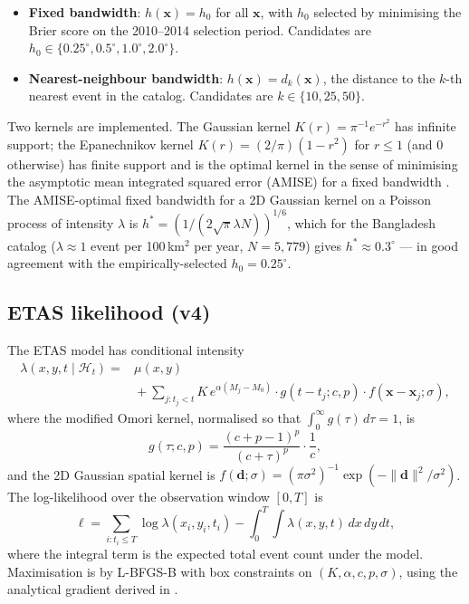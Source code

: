 \documentclass[10pt,a4paper,twocolumn]{article}
\begin{document}
\begin{itemize}[leftmargin=1.2em,itemsep=2pt,topsep=2pt]
\item \textbf{Fixed bandwidth}: $h(\mathbf{x}) = h_0$ for all $\mathbf{x}$, with $h_0$ selected by minimising the Brier score on the 2010--2014 selection period. Candidates are $h_0\in\{0.25^\circ, 0.5^\circ, 1.0^\circ, 2.0^\circ\}$.
\item \textbf{Nearest-neighbour bandwidth}: $h(\mathbf{x}) = d_k(\mathbf{x})$, the distance to the $k$-th nearest event in the catalog. Candidates are $k\in\{10, 25, 50\}$.
\end{itemize}

Two kernels are implemented. The Gaussian kernel $K(r) = \pi^{-1} e^{-r^2}$ has infinite support; the Epanechnikov kernel $K(r) = (2/\pi)(1-r^2)$ for $r\leq 1$ (and 0 otherwise) has finite support and is the optimal kernel in the sense of minimising the asymptotic mean integrated squared error (AMISE) for a fixed bandwidth \cite{silverman1986}. The AMISE-optimal fixed bandwidth for a 2D Gaussian kernel on a Poisson process of intensity $\lambda$ is $h^* = (1/(2\sqrt{\pi}\lambda N))^{1/6}$, which for the Bangladesh catalog ($\lambda\approx 1$ event per 100\,km$^2$ per year, $N=5{,}779$) gives $h^*\approx 0.3^\circ$ --- in good agreement with the empirically-selected $h_0=0.25^\circ$.

\subsection{ETAS likelihood (v4)}\label{app:etas-likelihood}

The ETAS model has conditional intensity
\begin{align*}
\lambda(x, y, t \mid \mathcal{H}_t) = {}& \mu(x, y) \\
&{} + \sum_{j: t_j < t} K\, e^{\alpha(M_j - M_0)} \cdot g(t - t_j; c, p) \cdot f(\mathbf{x} - \mathbf{x}_j; \sigma),
\end{align*}
where the modified Omori kernel, normalised so that $\int_0^\infty g(\tau)\, d\tau = 1$, is
\begin{equation}\label{eq:omori-kernel}
g(\tau; c, p) = \frac{(c+p-1)^p}{(c+\tau)^p} \cdot \frac{1}{c},
\end{equation}
and the 2D Gaussian spatial kernel is $f(\mathbf{d}; \sigma) = (\pi \sigma^2)^{-1} \exp(-\|\mathbf{d}\|^2 / \sigma^2)$. The log-likelihood over the observation window $[0, T]$ is
\begin{equation}\label{eq:etas-loglik}
\ell = \sum_{i: t_i \leq T} \log \lambda(x_i, y_i, t_i) - \int_0^T \!\!\int \lambda(x, y, t)\, dx\, dy\, dt,
\end{equation}
where the integral term is the expected total event count under the model. Maximisation is by L-BFGS-B with box constraints on $(K, \alpha, c, p, \sigma)$, using the analytical gradient derived in \cite{ogata1988}.
\end{document}
